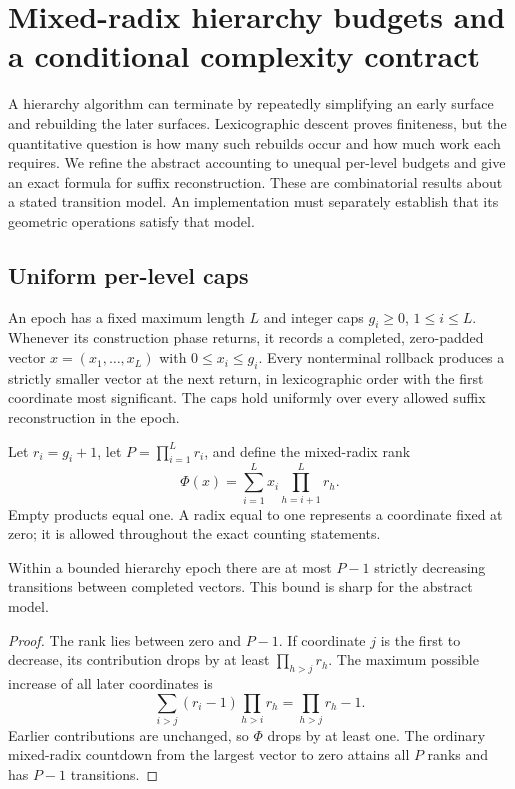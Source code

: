 \section{Mixed-radix hierarchy budgets and a conditional complexity contract}
\label{sec:hierarchy}

A hierarchy algorithm can terminate by repeatedly simplifying an early surface
and rebuilding the later surfaces.  Lexicographic descent proves finiteness,
but the quantitative question is how many such rebuilds occur and how much
work each requires.  We refine the abstract accounting to unequal per-level
budgets and give an exact formula for suffix reconstruction.  These are
combinatorial results about a stated transition model.  An implementation must
separately establish that its geometric operations satisfy that model.

\subsection{Uniform per-level caps}

\begin{definition}
An epoch has a fixed maximum length $L$ and integer caps $g_i\geq0$,
$1\leq i\leq L$.  Whenever its construction phase returns, it records a
completed, zero-padded vector $x=(x_1,\ldots,x_L)$ with $0\leq x_i\leq g_i$.
Every nonterminal rollback produces a strictly smaller vector at the next
return, in lexicographic order with the first coordinate most significant.
The caps hold uniformly over every allowed suffix reconstruction in the
epoch.
\end{definition}

Let $r_i=g_i+1$, let $P=\prod_{i=1}^L r_i$, and define the mixed-radix rank
\begin{equation}
 \Phi(x)=\sum_{i=1}^L x_i\prod_{h=i+1}^L r_h.
 \label{eq:hierarchy-rank}
\end{equation}
Empty products equal one.  A radix equal to one represents a coordinate fixed
at zero; it is allowed throughout the exact counting statements.

\begin{proposition}
\label{prop:mixed-radix}
Within a bounded hierarchy epoch there are at most $P-1$ strictly decreasing
transitions between completed vectors.  This bound is sharp for the abstract
model.
\end{proposition}

\begin{proof}
The rank lies between zero and $P-1$.  If coordinate $j$ is the first to
decrease, its contribution drops by at least $\prod_{h>j}r_h$.  The maximum
possible increase of all later coordinates is
\[
 \sum_{i>j}(r_i-1)\prod_{h>i}r_h
   =\prod_{h>j}r_h-1.
\]
Earlier contributions are unchanged, so $\Phi$ drops by at least one.  The
ordinary mixed-radix countdown from the largest vector to zero attains all
$P$ ranks and has $P-1$ transitions.
\end{proof}

